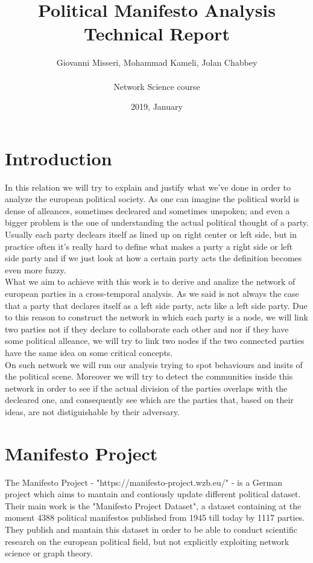 \documentclass{article}%
\title{%
  Political Manifesto Analysis \\
  \large Technical Report}
\date{2019, January}
\author{Giovanni Misseri, Mohammad Kameli, Jolan Chabbey \\ \\ 
Network Science course}
\begin{document}
\maketitle
\section{Introduction}
In this relation we will try to explain and justify what we've done in order to analyze the european political society.
As one can imagine the political world is dense of alleances, sometimes decleared and sometimes unspoken; and even a bigger problem is the one of understanding the actual political thought of a party.
Usually each party declears itself as lined up on right center or left side, but in practice often it's really hard to define what makes a party a right side or left side party and if we just look at how a certain party acts the definition becomes even more fuzzy.\\

What we aim to achieve with this work is to derive and analize the network of european parties in a cross-temporal analysis. As we said is not always the case that a party that declares itself as a left side party, acts like a left side party. Due to this reason to construct the network in which each party is a node, we will link two parties not if they declare to collaborate each other and nor if they have some political alleance, we will try to link two nodes if the two connected parties have the same idea on some critical concepts.\\

On such network we will run our analysis trying to spot behaviours and insits of the political scene. Moreover we will try to detect the communities inside this network in order to see if the actual division of the parties overlaps with the decleared one, and consequently see which are the parties that, based on their ideas, are not distiguishable by their adversary.

\section*{Manifesto Project}

The Manifesto Project - "https://manifesto-project.wzb.eu/" - is a German project which aims to mantain and contiously update different political dataset. Their main work is the "Manifesto Project Dataset", a dataset containing at the moment 4388 political manifestos published from 1945 till today by 1117 parties.
They publish and mantain this dataset in order to be able to conduct scientific research on the european political field, but not explicitly exploiting network science or graph theory.
\end{document}
